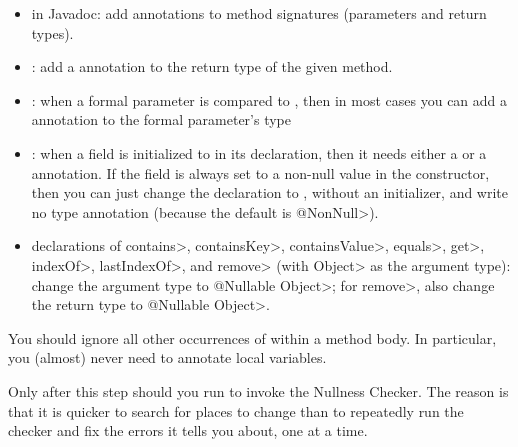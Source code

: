 \begin{itemize}
\item
  in Javadoc:  add  annotations to method signatures (parameters and return types).
\item
  :  add a  annotation to the return type
  of the given method.
\item
  :  when a formal parameter is compared to
  , then in most cases you can add a  annotation
  to the formal parameter's type
\item
  :  when a field is initialized to
   in its declaration, then it needs either a
   or a
   annotation.  If the field
  is always set to a non-null value in the constructor, then you can just
  change the declaration to , without an
  initializer, and write no type annotation (because the default is
  \<@NonNull>).
\item
  declarations of \<contains>, \<containsKey>, \<containsValue>, \<equals>,
  \<get>, \<indexOf>, \<lastIndexOf>, and \<remove> (with \<Object> as the
  argument type):
  change the argument type to \<@Nullable Object>; for \<remove>, also change
  the return type to \<@Nullable Object>.

\end{itemize}

\noindent
You should ignore all other occurrences of  within a method
body.  In particular, you (almost) never need to annotate local variables.

Only after this step should you run  to invoke
the Nullness Checker.  The reason is that it is quicker to search for
places to change than to repeatedly run the checker and fix the errors it
tells you about, one at a time.

